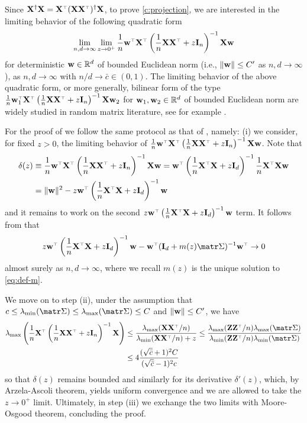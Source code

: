 \documentclass[../../thesis.tex]{subfiles}
\begin{document}
Since $\X^\dagger \X = \X^\top (\X \X^\top)^\dagger \X$, to prove
\cref{c:projection}, we are interested in the limiting behavior of the
following quadratic form
\[
  \lim_{n,d \to \infty} \lim_{z \to 0^+} \frac1n \w^\top \X^\top \left( \frac1n \X \X^\top + z \I_n \right)^{-1} \X \w
\]
for deterministic $\mathbf w \in \mathbb R^{d}$ of bounded Euclidean norm (i.e., $\| \mathbf w \| \le C'$ as $n,d \to \infty$), as $n,d \to \infty$ with $n/d \to \bar c \in (0,1)$. The limiting behavior of the above quadratic form, or more generally, bilinear form of the type $\frac1n \w_1^\top \X^\top \left( \frac1n \X \X^\top + z \I_n \right)^{-1} \X \w_2$ for $\mathbf w_1, \mathbf w_2 \in \mathbb R^{d}$ of bounded Euclidean norm are widely studied in random matrix literature, see for example \cite{hachem2013bilinear}.

For the proof of  we follow the same protocol as that of
, namely: (i) we consider, for fixed $z > 0$, the limiting
behavior of $\frac1n \w^\top \X^\top \left( \frac1n \X \X^\top + z \I_n
  \right)^{-1} \X \w$. Note that
\begin{align*}
  \delta(z) & \equiv \frac1n \w^\top \X^\top \left( \frac1n \X \X^\top + z \I_n \right)^{-1} \X \w = \w^\top \left( \frac1n \X^\top \X + z \I_d \right)^{-1} \frac1n \X^\top \X \w \\
            & = \| \w \|^2 - z \w^\top \left( \frac1n \X^\top \X + z \I_d \right)^{-1} \w
\end{align*}
and it remains to work on the second $z \w^\top \left( \frac1n \X^\top \X + z \I_d \right)^{-1} \w$ term.
It follows from \cite{hachem2013bilinear} that
\[
  z \w^\top \left( \frac1n \X^\top \X + z \I_d \right)^{-1} \w - \w^\top (\I_d + m(z) \Sigmab)^{-1} \w^\top \to 0
\]
almost surely as $n,d \to \infty$, where we recall $m(z)$ is the unique solution to \eqref{eq:def-m}.

We move on to step (ii), under the assumption that $c \le \lambda_{\min} (\Sigmab) \le \lambda_{\max} (\Sigmab) \le C$ and $\| \mathbf w \| \le C'$, we have
\begin{align*}
  \lambda_{\max} \left( \frac1n \X^\top \left( \frac1n \X \X^\top + z \I_n \right)^{-1} \X \right) & \le \frac{ \lambda_{\max} (\X \X^\top/n) }{ \lambda_{\min} (\X \X^\top/n) + z } \le \frac{ \lambda_{\max} (\Z \Z^\top/n) \lambda_{\max} (\Sigmab) }{ \lambda_{\min} (\Z \Z^\top/n) \lambda_{\min} (\Sigmab) } \\
                                                                                                   & \le 4 \frac{ (\sqrt{\bar c} + 1)^2 C }{ (\sqrt{\bar c} -1)^2 c }
\end{align*}
so that $\delta(z)$ remains bounded and similarly for its derivative
$\delta'(z)$, which, by Arzela-Ascoli theorem, yields uniform
convergence and we are allowed to take the $z \to 0^+$
limit. Ultimately, in step (iii) we exchange the two limits with
Moore-Osgood theorem, concluding the proof.
\end{document}
